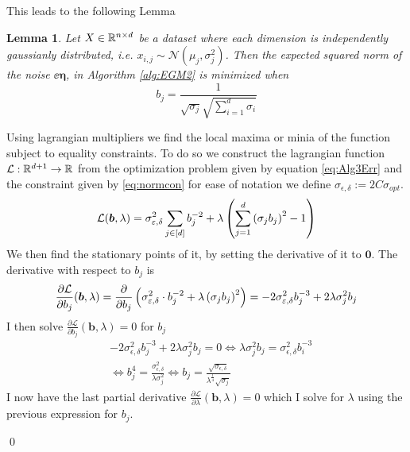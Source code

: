\documentclass[a4paper,12pt]{article}
\renewenvironment{proof}{{\textit{Proof} \\}}{\qed}
\newtheorem{lemma}{Lemma}[section]
\begin{document}
\noindent This leads to the following Lemma

\begin{lemma}
\label{lem:Optb}
Let $X \in \mathbb{R}^{n \times d}$ be a dataset where each dimension is independently gaussianly distributed, i.e.
$x_{i,j} \sim \mathcal{N}(\mu_j, \sigma_j^2)$.
Then the expected squared norm of the noise $\ee{\bm{\eta}}$, 
in Algorithm \ref{alg:EGM2} is minimized when
\[
    b_j = \frac{1}{\sqrt{\sigma_j} \sqrt{\sum_{i=1}^d \sigma_i}}
\]
\end{lemma}
\begin{proof}
Using lagrangian multipliers we find the local maxima or 
minia of the function subject to equality constraints.
To do so we construct the lagrangian function $\mathcal{L}: \mathbb{R}^{d+1} \rightarrow \mathbb{R}$ from the optimization problem given by
equation \eqref{eq:Alg3Err} and the constraint given by \eqref{eq:normcon} for ease of notation we define 
$\sigma_{\epsilon, \delta} := 2C\sigma_{opt}$.
\[
    \mathcal{L}(\bm{b},\lambda) = \sigma_{\varepsilon,\delta}^2\sum_{j \in [d]} b_j^{-2}
    + \lambda \left ( \sum_{j=1}^d \left (\sigma_j b_j\right)^2 - 1\right)
\]
We then find the stationary points of it,
by setting the derivative of it to $\bm{0}$.
The derivative with respect to $b_j$ is 
\[
    \frac{\partial \mathcal{L}}{\partial b_j} (\bm{b}, \lambda)= 
    \frac{\partial}{\partial b_j} \left (\sigma_{\varepsilon,\delta}^2 \cdot b_j^{-2}
    + \lambda \left (\sigma_j b_j\right)^2\right) =
    -2 \sigma_{\varepsilon,\delta}^2 b_j^{-3} + 2 \lambda \sigma_j^2b_j
\]
I then solve $\frac{\partial \mathcal{L}}{\partial b_j}(\bm{b},\lambda) = 0$ for $b_j$
\begin{align}
    &-2\sigma_{\epsilon,\delta}^2 b_j^{-3} + 2 \lambda \sigma_j^2b_j = 0 \iff
    \lambda \sigma_j^2b_j = \sigma_{\epsilon,\delta}^2 b_i^{-3}  \\
\label{eq:solvbi}
    &\iff b_j^4 = \frac{\sigma_{\epsilon,\delta}^2}{\lambda \sigma_j^2} \iff 
    b_j = \frac{\sqrt{\sigma_{\epsilon,\delta}}}{\lambda^{\frac{1}{4}} \sqrt{\sigma_j}} 
\end{align}
I now have the last partial derivative 
$\frac{\partial \mathcal{L}}{\partial \lambda}(\bm{b},\lambda) = 0$ which I solve for
$\lambda$ using the previous expression for $b_j$.


\end{proof}
\end{document}
